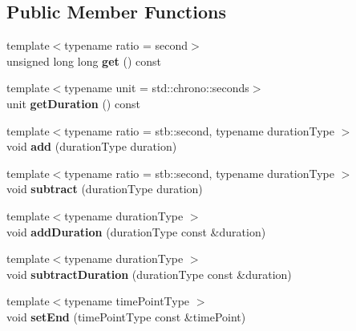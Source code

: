 \subsection*{Public Member Functions}
\begin{DoxyCompactItemize}
\item 
\hypertarget{classstb_1_1Counter_a3fb6070182f506ba06f210b7b982b6b7}{{\footnotesize template$<$typename ratio  = second$>$ }\\unsigned long long {\bfseries get} () const }\label{classstb_1_1Counter_a3fb6070182f506ba06f210b7b982b6b7}

\item 
\hypertarget{classstb_1_1Counter_a749405cb7c9d1d3883ef1470544c9f37}{{\footnotesize template$<$typename unit  = std\+::chrono\+::seconds$>$ }\\unit {\bfseries get\+Duration} () const }\label{classstb_1_1Counter_a749405cb7c9d1d3883ef1470544c9f37}

\item 
\hypertarget{classstb_1_1Counter_a7f4cfcd3805f5468f3ac94aef382ab26}{{\footnotesize template$<$typename ratio  = stb\+::second, typename duration\+Type $>$ }\\void {\bfseries add} (duration\+Type duration)}\label{classstb_1_1Counter_a7f4cfcd3805f5468f3ac94aef382ab26}

\item 
\hypertarget{classstb_1_1Counter_a01433bb56263d3e3fae9272b90e53946}{{\footnotesize template$<$typename ratio  = stb\+::second, typename duration\+Type $>$ }\\void {\bfseries subtract} (duration\+Type duration)}\label{classstb_1_1Counter_a01433bb56263d3e3fae9272b90e53946}

\item 
\hypertarget{classstb_1_1Counter_a9b9138a652f88bebed3d8af8115e5e37}{{\footnotesize template$<$typename duration\+Type $>$ }\\void {\bfseries add\+Duration} (duration\+Type const \&duration)}\label{classstb_1_1Counter_a9b9138a652f88bebed3d8af8115e5e37}

\item 
\hypertarget{classstb_1_1Counter_a528913c338c78e3b0a04978fea20d897}{{\footnotesize template$<$typename duration\+Type $>$ }\\void {\bfseries subtract\+Duration} (duration\+Type const \&duration)}\label{classstb_1_1Counter_a528913c338c78e3b0a04978fea20d897}

\item 
\hypertarget{classstb_1_1Counter_a168a324ebedbff457fa1b8fefa6f1f12}{{\footnotesize template$<$typename time\+Point\+Type $>$ }\\void {\bfseries set\+End} (time\+Point\+Type const \&time\+Point)}\label{classstb_1_1Counter_a168a324ebedbff457fa1b8fefa6f1f12}


\end{DoxyCompactItemize}
